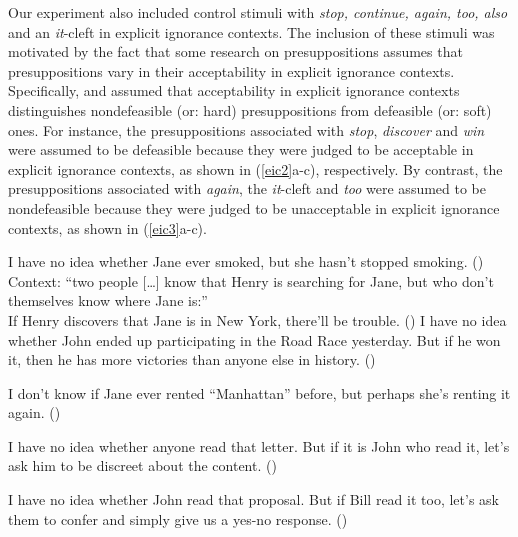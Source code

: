 \documentclass[11pt,fleqn]{article}
\def\verymarginal{{\leavevmode\llap{??}}}
\def\infelic{{\leavevmode\llap{\#}}}
\newcommand{\6}{\mbox{$[\hspace*{-.6mm}[$}}
\newcommand{\9}{\mbox{$]\hspace*{-.6mm}]$}}
\begin{document}
Our experiment also included control stimuli with \emph{stop, continue, again, too, also} and an {\em it}-cleft in explicit ignorance contexts. The inclusion of these stimuli was motivated by the fact that some research on presuppositions assumes that presuppositions vary in their acceptability in explicit ignorance contexts. Specifically, \citealt{simons01} and \citealt{abusch10} assumed that acceptability in explicit ignorance contexts distinguishes nondefeasible (or: hard) presuppositions from defeasible (or: soft) ones. For instance, the presuppositions associated with \emph{stop}, \emph{discover} and \emph{win} were assumed to be defeasible because they were judged to be acceptable in explicit ignorance contexts, as shown in (\ref{eic2}a-c), respectively. By contrast, the presuppositions associated with \emph{again}, the \emph{it}-cleft and \emph{too} were assumed to be nondefeasible because they were judged to be unacceptable in explicit ignorance contexts, as shown in (\ref{eic3}a-c).

\begin{exe}
\ex\label{eic2}
\begin{xlist}
\ex I have no idea whether Jane ever smoked, but she hasn't stopped smoking. \hfill (\citealt[443]{simons01})
\ex Context: ``two people [\ldots] know that Henry is searching for Jane, but who don't themselves know where Jane is:'' \\ If Henry discovers that Jane is in New York, there'll be trouble. \hfill (\citealt[434]{simons01})
\ex I have no idea whether John ended up participating in the
Road Race yesterday. But if he won it, then he has more victories than anyone else in history. \hfill (\citealt[39]{abusch10})
\end{xlist}
\ex\label{eic3}
\begin{xlist}
\ex\infelic I don't know if Jane ever rented ``Manhattan'' before, but perhaps she's renting it again. \hfill (\citealt[443]{simons01})

\ex \verymarginal I have no idea whether anyone read that letter. But if it is John
who read it, let's ask him to be discreet about the content. \hfill (\citealt[40]{abusch10})

\ex \verymarginal I have no idea whether John read that proposal. But if Bill read it too, let's ask them to confer and simply give us a yes-no response. \hfill (\citealt[40]{abusch10})
\end{xlist}
\end{exe}
\end{document}
